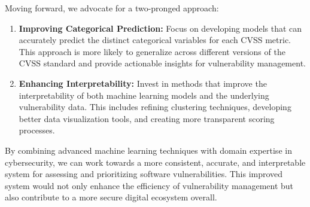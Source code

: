 \documentclass[12pt]{article}
\begin{document}
Moving forward, we advocate for a two-pronged approach:

\begin{enumerate}

	\item \textbf{Improving Categorical Prediction:} Focus on developing models that can accurately
	      predict the distinct categorical variables for each CVSS metric. This approach is more
	      likely to generalize across different versions of the CVSS standard and provide actionable
	      insights for vulnerability management.

	\item \textbf{Enhancing Interpretability:} Invest in methods that improve the interpretability
	      of both machine learning models and the underlying vulnerability data. This includes
	      refining clustering techniques, developing better data visualization tools, and creating
	      more transparent scoring processes.

\end{enumerate}

By combining advanced machine learning techniques with domain expertise in cybersecurity, we can
work towards a more consistent, accurate, and interpretable system for assessing and prioritizing
software vulnerabilities. This improved system would not only enhance the efficiency of
vulnerability management but also contribute to a more secure digital ecosystem overall.



\end{document}
